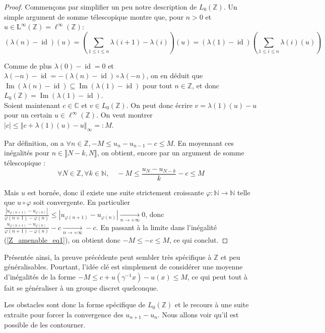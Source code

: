 \documentclass[a4paper,12pt]{article}
\newcommand{\N}{\mathbb{N}}
\newcommand{\Z}{\mathbb{Z}}
\newcommand{\C}{\mathbb{C}}
\newcommand{\norm}[1]{\left\Vert #1\right\Vert}
\newcommand{\abs}[1]{\left\vert#1\right\vert}
\newcommand{\inv}{^{-1}}
\newcommand{\comp}{\circ}
\DeclareMathOperator{\id}{id}
\DeclareMathOperator{\Ima}{Im}
\begin{document}
\begin{proof}
    Commençons par simplifier un peu notre description de $L_0(\Z)$. Un simple argument de somme
    télescopique montre que, pour $n>0$ et $u\in\mathrm{L}^\infty(\Z)=\ell^\infty(\Z)$:
    \begin{equation*}
        (\lambda(n)-\id)(u) = \left(\sum_{1\le i\le n} \lambda(i+1) - \lambda(i)\right)(u) = (\lambda(1)-\id)\left(\sum_{1\le i\le n} \lambda(i)(u)\right)
    \end{equation*}

    Comme de plus $\lambda(0)-\id = 0$ et $\lambda(-n)-\id = -(\lambda(n)-\id)\comp\lambda(-n)$,
    on en déduit que $\Ima(\lambda(n)-\id)\subseteq\Ima(\lambda(1)-\id)$ pour tout $n\in\Z$, et donc $L_0(\Z) = \Ima(\lambda(1)-\id)$. \\

    Soient maintenant $c\in\C$ et $v\in L_0(\Z)$. On peut donc écrire $v = \lambda(1)(u)-u$ pour un certain $u\in\ell^\infty(\Z)$. 
    On veut montrer $\abs{c}\le\norm{c + \lambda(1)(u) - u}_\infty =: M$. 

    Par définition, on a $\forall n\in\Z, -M\le u_n-u_{n-1}-c\le M$. En moyennant ces inégalités pour 
    $n\in\rrbracket N-k, N\rrbracket$, on obtient, encore par un argument de somme télescopique :
    \begin{equation}\label{Z_amenable_eq1}
        \forall N\in\Z, \forall k\in\N,\quad -M\le \frac{u_N - u_{N-k}}{k} - c \le M
    \end{equation}

    Mais $u$ est bornée, donc il existe une suite strictement croissante $\varphi:\N\to\N$ telle que $u\comp\varphi$
    soit convergente. En particulier $\frac{\abs{u_{\varphi(n+1)}-u_{\varphi(n)}}}{\varphi(n+1)-\varphi(n)}\le\abs{u_{\varphi(n+1)}-u_{\varphi(n)}}\xrightarrow[n\to+\infty]{}0$, 
    donc $\frac{u_{\varphi(n+1)}-u_{\varphi(n)}}{\varphi(n+1)-\varphi(n)}-c\xrightarrow[n\to+\infty]{}-c$. En passant à la limite dans l'inégalité (\ref{Z_amenable_eq1}),
    on obtient donc $-M\le-c\le M$, ce qui conclut.
\end{proof}

Présentée ainsi, la preuve précédente peut sembler très spécifique à $\Z$ et peu généralisables. Pourtant, l'idée clé 
est simplement de considérer une \og{}moyenne\fg{} d'inégalités de la forme $-M\le c + u(\gamma\inv x) - u(x)\le M$, 
ce qui peut tout à fait se généraliser à un groupe discret quelconque. 

Les obstacles sont donc la forme spécifique de $L_0(\Z)$ et le recours à une suite extraite pour forcer la convergence des $u_{n+1}-u_n$. Nous allons voir 
qu'il est possible de les contourner.
\end{document}
